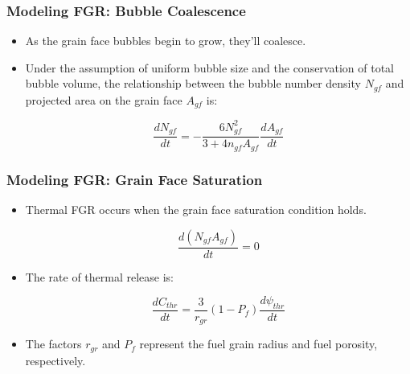 \begin{frame}
\frametitle{Modeling FGR: Bubble Coalescence}

\begin{itemize}  
  \item As the grain face bubbles begin to grow, they'll coalesce. 
  \item Under the assumption of uniform bubble size and the conservation of total bubble volume, the relationship between the bubble number density $N_{gf}$ and projected area on the grain face $A_{gf}$ is:

\begin{equation}
 \frac{dN_{gf}}{dt} = -\frac{6N_{gf}^2}{3+4n_{gf}A_{gf}} \frac{dA_{gf}}{dt} \nonumber
\end{equation}

\end{itemize}

\end{frame}
\begin{frame}
\frametitle{Modeling FGR: Grain Face Saturation}

\begin{itemize}  
  \item Thermal FGR occurs when the grain face saturation condition holds.

\begin{equation}
 \frac{d\left(N_{gf} A_{gf}\right)}{dt} = 0 \nonumber 
\end{equation}
  
  \item The rate of thermal release is:

\begin{equation}
 \frac{dC_{thr}}{dt} = \frac{3}{r_{gr}}\left(1 - P_f\right) \frac{d\psi_{thr}}{dt}  \nonumber
\end{equation} 

  \item The factors $r_{gr}$ and $P_f$ represent the fuel grain radius and fuel porosity, respectively. 

\end{itemize}

\end{frame}
